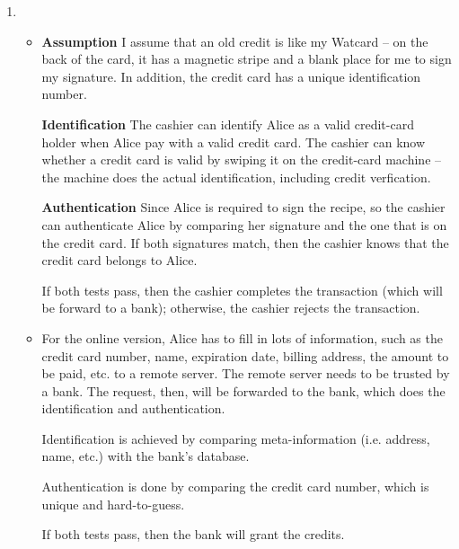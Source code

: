 \documentclass[12pt]{article}
\begin{document}
\begin{enumerate}
\item
\begin{itemize}
\item
{\bf Assumption}
I assume that an old credit is like my Watcard -- on the back of the card, it has a magnetic stripe and a blank place for me to sign my signature.
In addition, the credit card has a unique identification number.

{\bf Identification}
The cashier can identify Alice as a valid credit-card holder when Alice pay with a valid credit card.
The cashier can know whether a credit card is valid by swiping it on the credit-card machine -- the machine does the actual identification, including credit verfication.

{\bf Authentication}
Since Alice is required to sign the recipe, so the cashier can authenticate Alice by comparing her signature and the one that is on the credit card.
If both signatures match, then the cashier knows that the credit card belongs to Alice.

If both tests pass, then the cashier completes the transaction (which will be forward to a bank); otherwise, the cashier rejects the transaction.

\item
For the online version, Alice has to fill in lots of information, such as the credit card number, name, expiration date, billing address, the amount to be paid, etc. to a remote server.
The remote server needs to be trusted by a bank.
The request, then, will be forwarded to the bank, which does the identification and authentication.

Identification is achieved by comparing meta-information (i.e. address, name, etc.) with the bank's database.

Authentication is done by comparing the credit card number, which is unique and hard-to-guess.

If both tests pass, then the bank will grant the credits.
\end{itemize}
\done
\end{enumerate}
\end{document}
